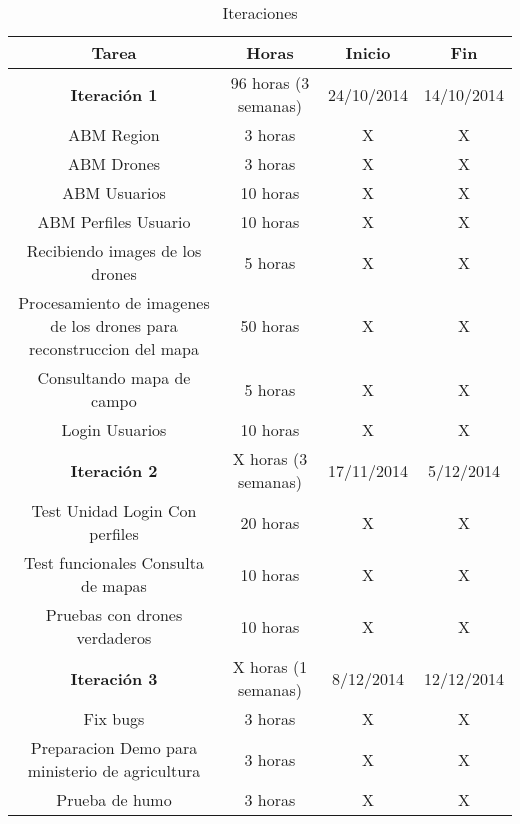 \begin{table}[ht]
\caption{Iteraciones}
\centering 
\begin{tabular}{c c c c}
\hline\hline 
Tarea              & Horas & Inicio & Fin\\
\hline	
\textbf{Iteraci\'on 1} & 96 horas (3 semanas) & 24/10/2014 & 14/10/2014  \\
ABM Region & 3 horas & X & X \\
ABM Drones & 3 horas & X & X \\
ABM Usuarios & 10 horas & X & X \\
ABM Perfiles Usuario & 10 horas & X & X \\
Recibiendo images de los drones & 5 horas & X & X \\
Procesamiento de imagenes de los drones para reconstruccion del mapa & 50 horas & X & X \\
Consultando mapa de campo & 5 horas & X & X \\
Login Usuarios & 10 horas & X & X \\
\textbf{Iteraci\'on 2} & X horas (3 semanas)& 17/11/2014 & 5/12/2014  \\
Test Unidad Login Con perfiles & 20 horas & X & X \\
Test funcionales Consulta de mapas & 10 horas & X & X \\
Pruebas con drones verdaderos & 10 horas & X & X \\
\textbf{Iteraci\'on 3} & X  horas (1 semanas)& 8/12/2014 & 12/12/2014  \\
Fix bugs & 3 horas & X & X \\
Preparacion Demo para ministerio de agricultura & 3 horas & X & X \\
Prueba de humo & 3 horas & X & X \\




\end{tabular}
\end{table}
